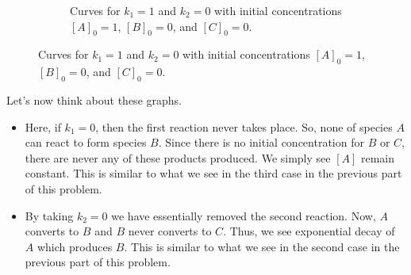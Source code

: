 \documentclass[12pt]{article} %
\begin{document}
\begin{solution}
\begin{enumerate}[(a)]
\begin{figure}[H]
\begin{subfigure}[b]{0.3\textwidth}
            \caption{Curves for $k_1=1$ and $k_2=0$ with initial concentrations $[A]_0=1$, $[B]_0=0$, and $[C]_0=0$. }
        \end{subfigure}
    \end{figure}
    
    Let's now think about these graphs.
    \begin{itemize}
            \item Here, if $k_1=0$, then the first reaction never takes place.  So, none of species $A$ can react to form species $B$.  Since there is no initial concentration for $B$ or $C$, there are never any of these products produced.  We simply see $[A]$ remain constant. This is similar to what we see in the third case in the previous part of this problem.
            \item By taking $k_2=0$ we have essentially removed the second reaction.  Now, $A$ converts to $B$ and $B$ never converts to $C$.  Thus, we see exponential decay of $A$ which produces $B$.  This is similar to what we see in the second case in the previous part of this problem.
    \end{itemize}


\end{enumerate}
\end{solution}
\end{document}
